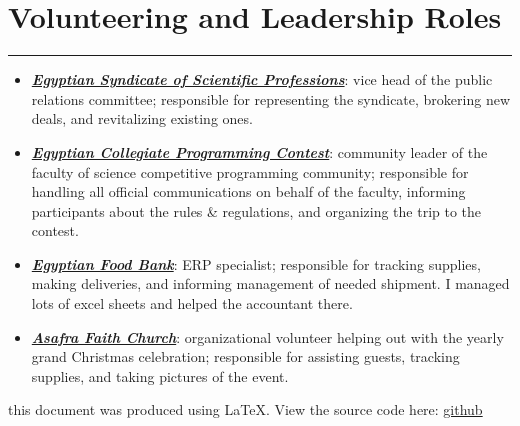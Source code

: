 \documentclass[10pt]{article}
\newcommand{\fancy}[1]{\Large\textbf{\textit{#1}}}
\begin{document}
\vspace{1em}

\section*{Volunteering and Leadership Roles}
\hrule
\vspace{1em}
\begin{itemize}
	\item \fancy{\href{https://www.linkedin.com/company/syndicate-of-scientific-professions-alexandria-نقابة-المهن-العلمية-الإسكندرية/}{Egyptian Syndicate of Scientific Professions}}: vice head of the public relations committee; responsible for representing the syndicate, brokering new deals, and revitalizing existing ones.
	\item \fancy{\href{https://www.linkedin.com/showcase/ecpc-egyptian-collegiate-programming-contest1/}{Egyptian Collegiate Programming Contest}}: community leader of the faculty of science competitive programming community; responsible for handling all official communications on behalf of the faculty, informing participants about the rules \& regulations, and organizing the trip to the contest.
	\item \fancy{\href{https://www.linkedin.com/company/egyptian-food-bank/}{Egyptian Food Bank}}: ERP specialist; responsible for tracking supplies, making deliveries, and informing management of needed shipment. I managed lots of excel sheets and helped the accountant there.
	\item \fancy{\href{https://www.linkedin.com/company/asafra-faith-church/}{Asafra Faith Church}}: organizational volunteer helping out with the yearly grand Christmas celebration; responsible for assisting guests, tracking supplies, and taking pictures of the event.
\end{itemize}

\begin{center}
	{\tiny this document was produced using \LaTeX. View the source code here: \href{https://github.com/aaamw2000/myLaTeX/tree/main/pii/myCV}{github}}
\end{center}
\end{document}
